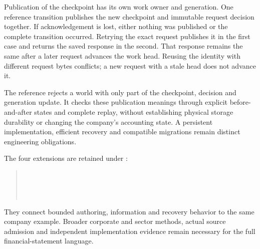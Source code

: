 Publication of the checkpoint has its own work owner and generation. One
reference transition publishes the new checkpoint and immutable request
decision together. If acknowledgement is lost, either nothing was published
or the complete transition occurred. Retrying the exact request publishes it
in the first case and returns the saved response in the second. That response
remains the same after a later request advances the work head. Reusing the
identity with different request bytes conflicts; a new request with a stale
head does not advance it.

The reference rejects a world with only part of the checkpoint, decision and
generation update. It checks these publication meanings through explicit
before-and-after states and complete replay, without establishing physical
storage durability or changing the company's accounting state. A persistent
implementation, efficient recovery and compatible migrations remain distinct
engineering obligations.

The four extensions are retained under :
\begin{quote}\small
{}\\
\\
\\
\end{quote}
They connect bounded authoring, information and recovery behavior to the same
company example. Broader corporate and
sector methods, actual source admission and independent implementation
evidence remain necessary for the full financial-statement language.


